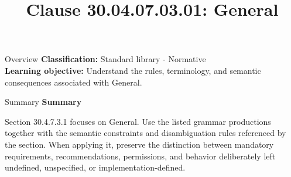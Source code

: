 \documentclass[10pt,letterpaper]{article}
\title{Clause 30.04.07.03.01: General}
\author{}
\date{}
\begin{document}
\maketitle
\begin{CornellOverviewBox}{Overview}
\textbf{Classification:} Standard library - Normative\\[2pt]
\textbf{Learning objective:} Understand the rules, terminology, and semantic consequences associated with General.
\end{CornellOverviewBox}\begin{CornellSummaryBox}{Summary}
{\sffamily\bfseries\color{Accent} Summary}\par\vspace{3pt}Section 30.4.7.3.1 focuses on General. Use the listed grammar productions together with the semantic constraints and disambiguation rules referenced by the section. When applying it, preserve the distinction between mandatory requirements, recommendations, permissions, and behavior deliberately left undefined, unspecified, or implementation-defined.
\end{CornellSummaryBox}
\end{document}
